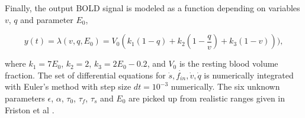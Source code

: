 Finally, the output BOLD signal is modeled as a function depending on variables $v$, $q$ and parameter $E_0$,  

\begin{equation}
y(t)= \lambda (v,q,E_0) = V_0 (k_1(1-q) + k_2(1- \frac{q}{v}) + k_3(1-v))),
\end{equation} 

where $k_1 = 7E_0$, $k_2 = 2$, $k_3 = 2E_0 - 0.2$, and $V_0$ is the resting blood volume fraction. The set of differential equations for ${\dot{s}, \dot{f_{in}}, \dot{v}, \dot{q}}$ is numerically integrated with Euler's method with step size $dt=10^{-3}$ numerically. The six unknown parameters $\epsilon$, $\alpha$, $\tau_0$, $\tau_f$, $\tau_s$ and $E_0$ are picked up from realistic ranges given in Friston et al  \citep{FRI00}. 





 
